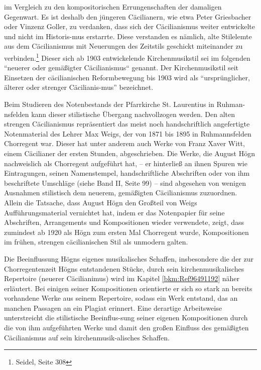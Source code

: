 \documentclass[a4paper]{article}
\begin{document}
im Vergleich zu den kompositorischen Errungenschaften der damaligen
Gegenwart. Es ist deshalb den jüngeren Cäcilianern, wie etwa Peter
Griesbacher oder Vinzenz Goller, zu verdanken, dass sich der
Cäcilianismus weiter entwickelte und nicht im Historis-mus erstarrte.
Diese verstanden es nämlich, alte Stilelemte aus dem Cäcilianismus mit
Neuerungen des Zeitstils geschickt miteinander zu verbinden.\footnote{
Seidel, Seite 308} Dieser sich ab 1903 entwickelende Kirchenmusikstil
sei im folgenden “neuerer oder gemäßigter Cäcilianismus“ genannt. Der
Kirchenmusikstil seit Einsetzen der cäcilianischen Reformbewegung bis
1903 wird als “ursprünglicher, älterer oder strenger Cäcilianis-mus”
bezeichnet.

Beim Studieren des Notenbestands der Pfarrkirche St. Laurentius in
Ruhman-nsfelden kann dieser stilistische Übergang nachvollzogen werden.
Den alten strengen Cäcilianismus repräsentiert das meist noch
handschriftlich angefertigte Notenmaterial des Lehrer Max Weigs, der
von 1871 bis 1895 in Ruhmannsfelden Chorregent war. Dieser hat unter
anderem auch Werke von Franz Xaver Witt, einem Cäcilianer der ersten
Stunden, abgeschrieben. Die Werke, die August Högn nachweislich als
Chorregent aufgeführt hat, – er hinterließ an ihnen Spuren wie
Eintragungen, seinen Namenstempel, handschriftliche Abschriften oder
von ihm beschriftete Umschläge (siehe Band II, Seite 99) – sind
abgesehen von wenigen Ausnahmen stilistisch dem neuerem, gemäßigten
Cäcilianismus zuzuordnen. Allein die Tatsache, dass August Högn den
Großteil von Weigs Aufführungsmaterial vernichtet hat, indem er das
Notenpapier für seine Abschriften, Arrangements und Kompositionen
wieder verwendete, zeigt, dass zumindest ab 1920 als Högn zum ersten
Mal Chorregent wurde, Kompositionen im frühen, strengen cäcilianischen
Stil als unmodern galten.

Die Beeinflussung Högns eigenes musikalisches Schaffen, insbesondere die
der zur Chorregentenzeit Högns entstandenen Stücke, durch sein
kirchenmusikalisches Repertoire (neuerer Cäcilianimus) wird im Kapitel
\ref{bkm:Ref96491192} näher erläutert. Bei einigen seiner Kompositionen
orientierte er sich so stark an bereits vorhandene Werke aus seinem
Repertoire, sodass ein Werk entstand, das an manchen Passagen an ein
Plagiat erinnert. Eine derartige Arbeitsweise unterstreicht die
stilistische Beeinflus-sung seiner eigenen Kompositionen durch die von
ihm aufgeführten Werke und damit den großen Einfluss des gemäßigten
Cäcilianismus auf sein kirchenmusik-alisches Schaffen.
\end{document}
